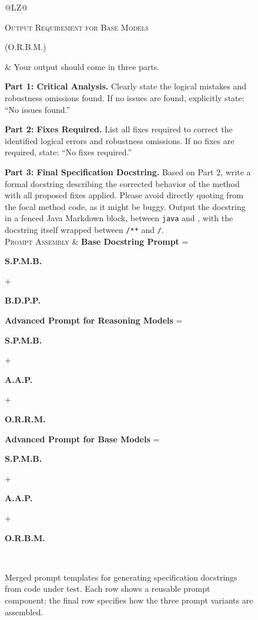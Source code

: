 \documentclass[acmsmall]{acmart}
\newcommand{\promptcode}[1]{\texttt{\tiny #1}}
\newcommand{\prompttag}[2]{%
    \begingroup
    \setlength{\fboxsep}{1pt}%
    \colorbox{#1}{\strut\textbf{#2}}%
    \endgroup
}
\newcommand{\promptcomponent}[2]{%
    \parbox[t]{\linewidth}{%
        \textsc{#1}\par\vspace{-0.15em}%
        {\normalfont\textcolor{black!60}{(#2)}}%
    }%
}
\newcommand{\bt}{\textasciigrave}
\newcommand{\javafence}{\bt\bt\bt{}java}
\newcommand{\mdfence}{\bt\bt\bt}
\begin{document}
\begin{figure}[b]
\begin{tabularx}{\dimexpr\textwidth-8pt\relax}{@{}LZ@{}}
\addlinespace[2pt]
\promptcomponent{Output Requirement for Base Models}{O.R.B.M.}
&
Your output should come in three parts.

\textbf{Part 1: Critical Analysis.} Clearly state the logical mistakes and robustness omissions found. If no issues are found, explicitly state: ``No issues found.''

\textbf{Part 2: Fixes Required.} List all fixes required to correct the identified logical errors and robustness omissions. If no fixes are required, state: ``No fixes required.''

\textbf{Part 3: Final Specification Docstring.} Based on Part 2, write a formal docstring describing the corrected behavior of the method with all proposed fixes applied. Please avoid directly quoting from the focal method code, as it might be buggy. Output the docstring in a fenced Java Markdown block, between \promptcode{\javafence} and \promptcode{\mdfence}, with the docstring itself wrapped between \promptcode{/**} and \promptcode{*/}.
\\

\addlinespace[2pt]
\textsc{Prompt Assembly}
&
\textbf{Base Docstring Prompt} =
\prompttag{PromptShared}{S.P.M.B.} + \prompttag{PromptBase}{B.D.P.P.}

\textbf{Advanced Prompt for Reasoning Models} =
\prompttag{PromptShared}{S.P.M.B.} + \prompttag{PromptAdvanced}{A.A.P.} + \prompttag{PromptReasoning}{O.R.R.M.}

\textbf{Advanced Prompt for Base Models} =
\prompttag{PromptShared}{S.P.M.B.} + \prompttag{PromptAdvanced}{A.A.P.} + \prompttag{PromptBaseModel}{O.R.B.M.}
\\

\bottomrule
\end{tabularx}

\vspace{-0.3em}
\caption{Merged prompt templates for generating specification docstrings from code under test. Each row shows a reusable prompt component; the final row specifies how the three prompt variants are assembled.}
\label{fig:docstring_prompt_templates}
\vspace{-0.5em}
\end{figure}
\end{document}
